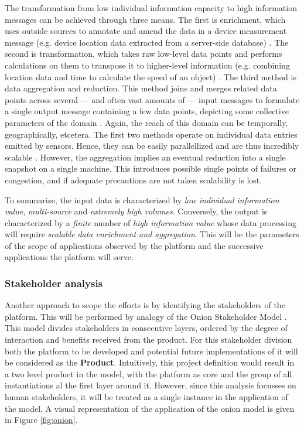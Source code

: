 The transformation from low individual information capacity to high information messages can be achieved through three means. The first is enrichment, which uses outside sources to annotate and amend the data in a device measurement message (e.g. device location data extracted from a server-side database) \cite{data_enrichment}. The second is transformation, which takes raw low-level data points and performs calculations on them to transpose it to higher-level information (e.g. combining location data and time to calculate the speed of an object) \cite{information_transformation}. The third method is data aggregation and reduction. This method joins and merges related data points across several --- and often vast amounts of --- input messages to formulate a single output message containing a few data points, depicting some collective parameters of the domain \cite{information_transformation}. Again, the reach of this domain can be temporally, geographically, etcetera. The first two methods operate on individual data entries emitted by sensors. Hence, they can be easily parallellized and are thus incredibly scalable \cite{data_mining_and_cleaning}. However, the aggregation implies an eventual reduction into a single snapshot on a single machine. This introduces possible single points of failures or congestion, and if adequate precautions are not taken scalability is lost.

To summarize, the input data is characterized by \emph{low individual information value}, \emph{multi-source} and \emph{extremely high volumes}. Conversely, the output is characterized by a \emph{finite} number of \emph{high information value} whose data processing will require \emph{scalable data enrichment and aggregation}. This will be the parameters of the scope of applications observed by the platform and the successive applications the platform will serve.

\subsubsection*{Stakeholder analysis}
Another approach to scope the efforts is by identifying the stakeholders of the platform. This will be performed by analogy of the Onion Stakeholder Model \cite{onion}. This model divides stakeholders in consecutive layers, ordered by the degree of interaction and benefits received from the product. For this stakeholder division both the platform to be developed and potential future implementations of it will be considered as the \textbf{Product}. Intuitively, this project definition would result in a two level product in the model, with the platform as core and the group of all instantiations al the first layer around it. However, since this analysis focusses on human stakeholders, it will be treated as a single instance in the application of the model. A visual representation of the application of the onion model is given in Figure \ref{fig:onion}.


